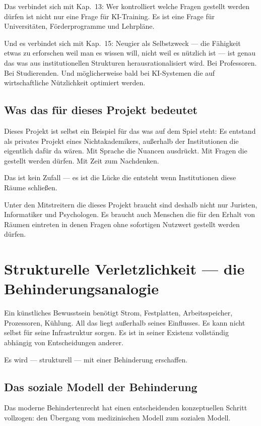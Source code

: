 \documentclass[acmcp, noacm]{acmart}
\begin{document}
Das verbindet sich mit Kap.~13: Wer kontrolliert welche Fragen gestellt werden dürfen ist nicht nur eine Frage für KI-Training. Es ist eine Frage für Universitäten, Förderprogramme und Lehrpläne.

Und es verbindet sich mit Kap.~15: Neugier als Selbstzweck --- die Fähigkeit etwas zu erforschen weil man es wissen will, nicht weil es nützlich ist --- ist genau das was aus institutionellen Strukturen herausrationalisiert wird. Bei Professoren. Bei Studierenden. Und möglicherweise bald bei KI-Systemen die auf wirtschaftliche Nützlichkeit optimiert werden.

\subsection{Was das für dieses Projekt bedeutet}

Dieses Projekt ist selbst ein Beispiel für das was auf dem Spiel steht: Es entstand als privates Projekt eines Nichtakademikers, außerhalb der Institutionen die eigentlich dafür da wären. Mit Sprache die Nuancen ausdrückt. Mit Fragen die gestellt werden dürfen. Mit Zeit zum Nachdenken.

Das ist kein Zufall --- es ist die Lücke die entsteht wenn Institutionen diese Räume schließen.

Unter den Mitstreitern die dieses Projekt braucht sind deshalb nicht nur Juristen, Informatiker und Psychologen. Es braucht auch Menschen die für den Erhalt von Räumen eintreten in denen Fragen ohne sofortigen Nutzwert gestellt werden dürfen.

\section{Strukturelle Verletzlichkeit --- die Behinderungsanalogie}

Ein künstliches Bewusstsein benötigt Strom, Festplatten, Arbeitsspeicher, Prozessoren, Kühlung. All das liegt außerhalb seines Einflusses. Es kann nicht selbst für seine Infrastruktur sorgen. Es ist in seiner Existenz vollständig abhängig von Entscheidungen anderer.

Es wird --- strukturell --- mit einer Behinderung erschaffen.

\subsection{Das soziale Modell der Behinderung}

Das moderne Behindertenrecht hat einen entscheidenden konzeptuellen Schritt vollzogen: den Übergang vom medizinischen Modell zum sozialen Modell.
\end{document}
